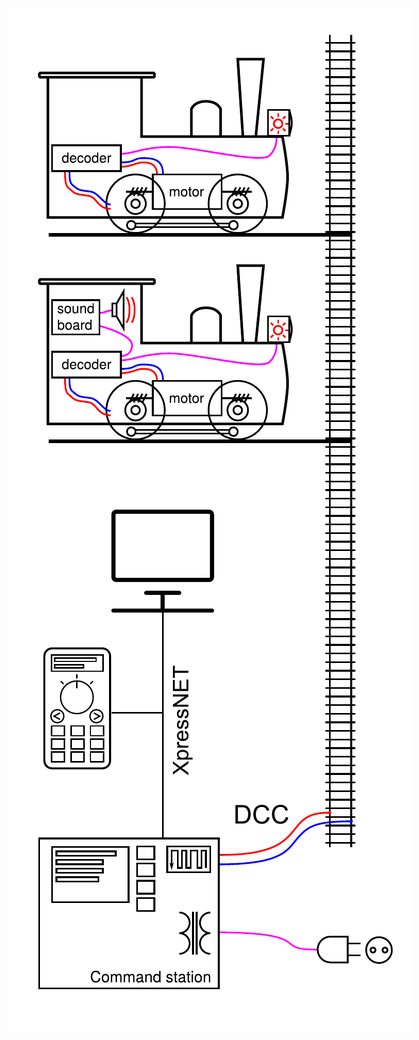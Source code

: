 \documentclass[aspectratio=169]{beamer}
\begin{document}
\begin{frame}
\begin{columns}
\begin{column}{.2\textwidth}
		\includegraphics[width=\columnwidth]{data/DCC_scheme.pdf}
	\end{column}
\end{columns}
\end{frame}
\end{document}
